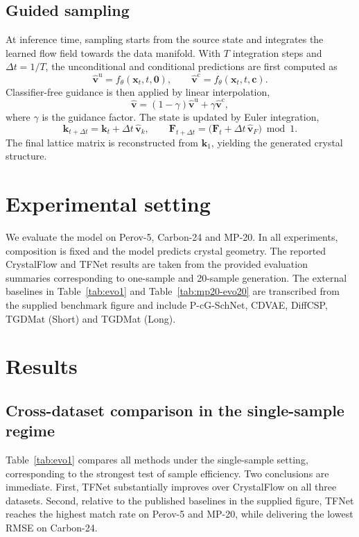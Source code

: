 \documentclass[fleqn,10pt]{wlscirep}
\begin{document}
\subsection*{Guided sampling}
At inference time, sampling starts from the source state and integrates the learned flow field towards the data manifold. With $T$ integration steps and $\Delta t = 1/T$, the unconditional and conditional predictions are first computed as
\begin{equation}
\hat{\mathbf{v}}^{\mathrm{u}} = f_{\theta}(\mathbf{x}_t, t, \mathbf{0}),
\qquad
\hat{\mathbf{v}}^{\mathrm{c}} = f_{\theta}(\mathbf{x}_t, t, \mathbf{c}).
\end{equation}
Classifier-free guidance is then applied by linear interpolation,
\begin{equation}
\hat{\mathbf{v}} = (1-\gamma)\hat{\mathbf{v}}^{\mathrm{u}} + \gamma \hat{\mathbf{v}}^{\mathrm{c}},
\end{equation}
where $\gamma$ is the guidance factor. The state is updated by Euler integration,
\begin{equation}
\mathbf{k}_{t+\Delta t} = \mathbf{k}_t + \Delta t\, \hat{\mathbf{v}}_k,
\qquad
\mathbf{F}_{t+\Delta t} = \big(\mathbf{F}_t + \Delta t\, \hat{\mathbf{v}}_F\big) \bmod 1.
\end{equation}
The final lattice matrix is reconstructed from $\mathbf{k}_1$, yielding the generated crystal structure.

\section*{Experimental setting}
We evaluate the model on Perov-5, Carbon-24 and MP-20. In all experiments, composition is fixed and the model predicts crystal geometry. The reported CrystalFlow and TFNet results are taken from the provided evaluation summaries corresponding to one-sample and 20-sample generation. The external baselines in Table~\ref{tab:evo1} and Table~\ref{tab:mp20-evo20} are transcribed from the supplied benchmark figure and include P-cG-SchNet, CDVAE, DiffCSP, TGDMat (Short) and TGDMat (Long).

\section*{Results}
\subsection*{Cross-dataset comparison in the single-sample regime}
Table~\ref{tab:evo1} compares all methods under the single-sample setting, corresponding to the strongest test of sample efficiency. Two conclusions are immediate. First, TFNet substantially improves over CrystalFlow on all three datasets. Second, relative to the published baselines in the supplied figure, TFNet reaches the highest match rate on Perov-5 and MP-20, while delivering the lowest RMSE on Carbon-24.
\end{document}
